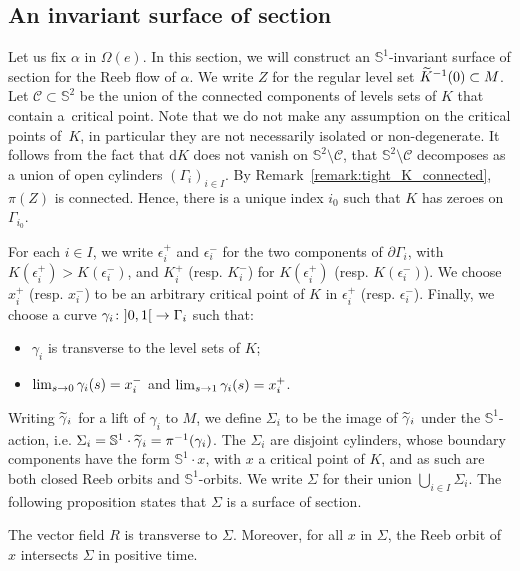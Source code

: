 \documentclass[AHL,Unicode,longabstracts]{cedram}
\newcommand{\bbS}{\mathbb{S}}
\newcommand{\clC}{\mathcal{C}}
\newcommand{\rmd}{\mathrm{d}}
\renewcommand*{\to}{\mathchoice{\longrightarrow}{\rightarrow}{\rightarrow}{\rightarrow}}
\let\oldtilde\tilde
\renewcommand*{\tilde}[1]{\mathchoice{\widetilde{#1}}{\widetilde{#1}}{\oldtilde{#1}}{\oldtilde{#1}}}
\newcommand{\bbS}{\mathbb{S}}
\begin{document}
\subsection{An invariant surface of section}\label{sub:invariant_surface_of_section}
Let us fix $\alpha$ in $\Omega(e)$. In this section, we will construct an $\bbS^1$-invariant surface of section for the Reeb flow of $\alpha$. We write $Z$ for the regular level set $\tilde K^{-1}(0) \subset M$. Let $\clC \subset \bbS^2$ be the union of the connected components of levels sets of $K$ that contain a~critical point. Note that we do not make any assumption on the critical points of~$K$, in particular they are not necessarily isolated or non-degenerate. It follows from the fact that $\rmd K$ does not vanish on $\bbS^2 \setminus \clC$, that $\bbS^2 \setminus \clC$ decomposes as a union of open cylinders $(\Gamma_i)_{i \in I}$. By Remark~\ref{remark:tight_K_connected}, $\pi(Z)$ is connected. Hence, there is a unique index $i_0$ such that $K$ has zeroes on $\Gamma_{i_0}$.

For each $i \in I$, we write $\epsilon_i^+$ and $\epsilon_i^-$ for the two components of $\partial \Gamma_i$, with $K(\epsilon_i^+) > K(\epsilon_i^-)$, and $K_i^+$ (resp. $K_i^-$) for $K(\epsilon_i^+)$ (resp. $K(\epsilon_i^-)$). We choose $x_i^+$ (resp. $x_i^-$) to be an arbitrary critical point of $K$ in $\epsilon_i^+$ (resp. $\epsilon_i^-$). Finally, we choose a curve $\gamma_i \colon\mathopen{]}0,1\mathclose{[}\to \Gamma_i$ such that:
\begin{itemize}
\item $\gamma_i$ is transverse to the level sets of $K$;
\item $\lim_{s \to 0}\gamma_i(s) = x_i^-$ and $\lim_{s \to 1}\gamma_i(s) = x_i^+$.
\end{itemize}


Writing $\tilde \gamma_i$ for a lift of $\gamma_i$ to $M$, we define $\Sigma_i$ to be the image of $\tilde \gamma_i$ under the $\bbS^1$-action, i.e. $\Sigma_i = \bbS^1\cdot \tilde \gamma_i = \pi^{-1}(\gamma_i)$. The $\Sigma_i$ are disjoint cylinders, whose boundary components have the form $\bbS^1 \cdot x$, with $x$ a critical point of $K$, and as such are both closed Reeb orbits and $\bbS^1$-orbits. We write $\Sigma$ for their union $\bigcup_{i \in I} \Sigma_i$. The following proposition states that $\Sigma$ is a surface of section.

\begin{prop}\label{prop:temps_de_retour_fini}
The vector field $R$ is transverse to $\Sigma$. Moreover, for all $x$ in $\Sigma$, the Reeb orbit of $x$ intersects $\Sigma$ in positive time.
\end{prop}
\end{document}
